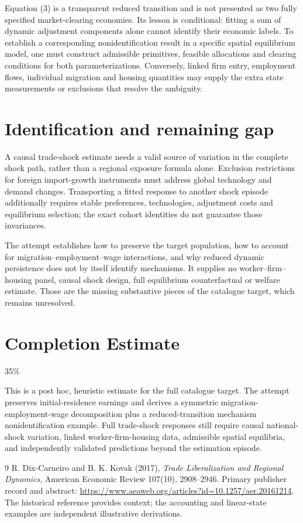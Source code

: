 \documentclass[11pt,a4paper]{article}
\begin{document}
Equation (3) is a transparent reduced transition and is not presented as two fully specified market-clearing economies. Its lesson is conditional: fitting a sum of dynamic adjustment components alone cannot identify their economic labels. To establish a corresponding nonidentification result in a specific spatial equilibrium model, one must construct admissible primitives, feasible allocations and clearing conditions for both parameterizations. Conversely, linked firm entry, employment flows, individual migration and housing quantities may supply the extra state measurements or exclusions that resolve the ambiguity.

\section{Identification and remaining gap}
A causal trade-shock estimate needs a valid source of variation in the complete shock path, rather than a regional exposure formula alone. Exclusion restrictions for foreign import-growth instruments must address global technology and demand changes. Transporting a fitted response to another shock episode additionally requires stable preferences, technologies, adjustment costs and equilibrium selection; the exact cohort identities do not guarantee those invariances.

The attempt establishes how to preserve the target population, how to account for migration--employment--wage interactions, and why reduced dynamic persistence does not by itself identify mechanisms. It supplies no worker--firm--housing panel, causal shock design, full equilibrium counterfactual or welfare estimate. Those are the missing substantive pieces of the catalogue target, which remains unresolved.

\section{Completion Estimate}
35\%

This is a post hoc, heuristic estimate for the full catalogue target.
The attempt preserves initial-residence earnings and derives a symmetric migration-employment-wage decomposition plus a reduced-transition mechanism nonidentification example. Full trade-shock responses still require causal national-shock variation, linked worker-firm-housing data, admissible spatial equilibria, and independently validated predictions beyond the estimation episode.

\begin{thebibliography}{9}
 R. Dix-Carneiro and B. K. Kovak (2017), \emph{Trade Liberalization and Regional Dynamics}, American Economic Review 107(10), 2908--2946. Primary publisher record and abstract: \url{https://www.aeaweb.org/articles?id=10.1257/aer.20161214}. The historical reference provides context; the accounting and linear-state examples are independent illustrative derivations.
\end{thebibliography}
\end{document}

